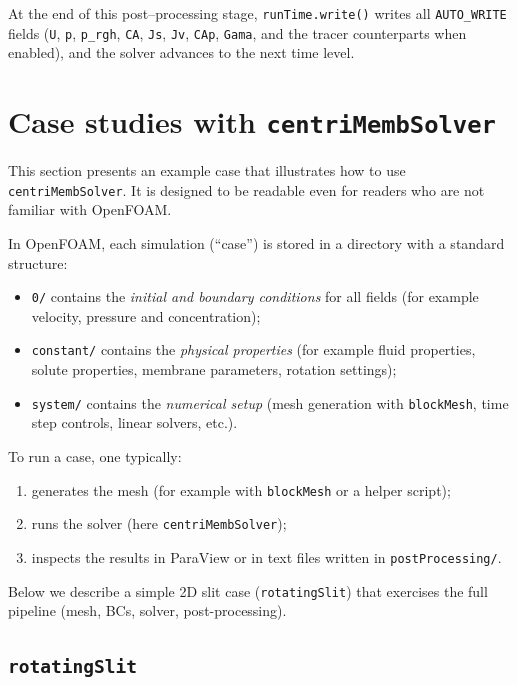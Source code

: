 \documentclass[11pt,a4paper]{article}
\begin{document}
At the end of this post--processing stage,
\texttt{runTime.write()} writes all \texttt{AUTO\_WRITE} fields
(\texttt{U}, \texttt{p}, \texttt{p\_rgh}, \texttt{CA}, \texttt{Js},
\texttt{Jv}, \texttt{CAp}, \texttt{Gama}, and the tracer
counterparts when enabled), and the solver advances to the next
time level.



\section{Case studies with \texttt{centriMembSolver}}
\label{sec:cases}

This section presents an example case that illustrates how to use
\texttt{centriMembSolver}.  It is designed to be readable even for
readers who are not familiar with OpenFOAM.

In OpenFOAM, each simulation (``case'') is stored in a directory with a
standard structure:
\begin{itemize}
	\item \texttt{0/} contains the \emph{initial and boundary conditions}
	for all fields (for example velocity, pressure and concentration);
	\item \texttt{constant/} contains the \emph{physical properties}
	(for example fluid properties, solute properties, membrane
	parameters, rotation settings);
	\item \texttt{system/} contains the \emph{numerical setup}
	(mesh generation with \texttt{blockMesh}, time step controls,
	linear solvers, etc.).
\end{itemize}

To run a case, one typically:
\begin{enumerate}
	\item generates the mesh (for example with \texttt{blockMesh} or a
	helper script);
	\item runs the solver (here \texttt{centriMembSolver});
	\item inspects the results in ParaView or in text files written in
	\texttt{postProcessing/}.
\end{enumerate}

Below we describe a simple 2D slit case (\texttt{rotatingSlit})
that exercises the full pipeline (mesh, BCs, solver, post-processing).

\subsection{\texttt{rotatingSlit}}
\end{document}
